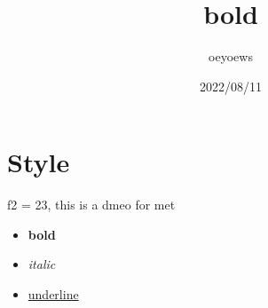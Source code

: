 \documentclass[UTF8]{ctexart}
\title{bold}
\author{oeyoews}
\date{2022/08/11}
\begin{document}
\maketitle


\section{Style}%
\label{sec:Style}

f2 = 23, this is a dmeo for met

\begin{itemize}
  \item  \textbf{bold}
  \item \textit{italic}
  \item \underline{underline}
\end{itemize}
\end{document}
